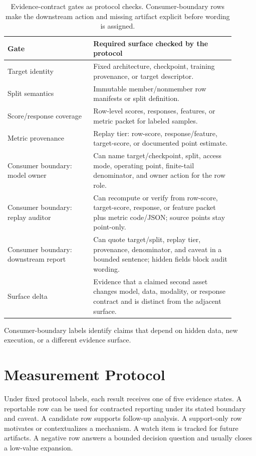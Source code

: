 \documentclass[10pt,conference]{IEEEtran}
\begin{document}
\begin{table}[t]
\centering
\caption{Evidence-contract gates as protocol checks. Consumer-boundary rows make
the downstream action and missing artifact explicit before wording is assigned.}
\label{tab:gates}
\scriptsize
\setlength{\tabcolsep}{3pt}
\begin{tabular}{L{0.34\linewidth}L{0.56\linewidth}}
\toprule
Gate & Required surface checked by the protocol \\
\midrule
Target identity & Fixed architecture, checkpoint, training provenance, or target descriptor. \\
Split semantics & Immutable member/nonmember row manifests or split definition. \\
Score/response coverage & Row-level scores, responses, features, or metric packet for labeled samples. \\
Metric provenance & Replay tier: row-score, response/feature, target-score, or documented point estimate. \\
Consumer boundary: model owner & Can name target/checkpoint, split, access mode, operating point, finite-tail denominator, and owner action for the row role. \\
Consumer boundary: replay auditor & Can recompute or verify from row-score, target-score, response, or feature packet plus metric code/JSON; source points stay point-only. \\
Consumer boundary: downstream report & Can quote target/split, replay tier, provenance, denominator, and caveat in a bounded sentence; hidden fields block audit wording. \\
Surface delta & Evidence that a claimed second asset changes model, data, modality, or response contract and is distinct from the adjacent surface. \\
\bottomrule
\end{tabular}
\end{table}

Consumer-boundary labels identify claims that depend on hidden data, new
execution, or a different evidence surface.

\section{Measurement Protocol}

Under fixed protocol labels, each result receives one of five evidence
states. A reportable row can be used for contracted reporting under its stated
boundary and caveat. A candidate row supports follow-up analysis. A support-only
row motivates or contextualizes a mechanism. A watch item is tracked for future
artifacts. A negative row answers a bounded decision question and usually closes
a low-value expansion.
\end{document}
